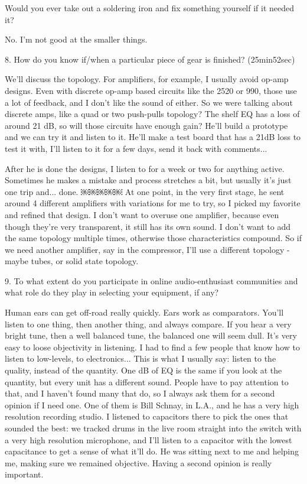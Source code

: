 Would you ever take out a soldering iron and fix something yourself if it needed it?

No. I'm not good at the smaller things.

8. How do you know if/when a particular piece of gear is finished? (25min52sec)

We'll discuss the topology. For amplifiers, for example, I usually avoid op-amp designs. Even with discrete op-amp based circuits like the 2520 or 990, those use a lot of feedback, and I don't like the sound of either. So we were talking about discrete amps, like a quad or two push-pulls topology? The shelf EQ has a loss of around 21 dB, so will those circuits have enough gain? He'll build a prototype and we can try it and listen to it. He'll make a test board that has a 21dB loss to test it with, I'll listen to it for a few days, send it back with comments...

After he is done the designs, I listen to for a week or two for anything active. Sometimes he makes a mistake and process stretches a bit, but usually it's just one trip and... done.
￼￼￼￼￼
At one point, in the very first stage, he sent around 4 different amplifiers with variations for me to try, so I picked my favorite and refined that design. I don't want to overuse one amplifier, because even though they're very transparent, it still has its own sound. I don't want to add the same topology multiple times, otherwise those characteristics compound. So if we need another amplifier, say in the compressor, I'll use a different topology - maybe tubes, or solid state topology.

9. To what extent do you participate in online audio-enthusiast communities and what role do they play in selecting your equipment, if any?

Human ears can get off-road really quickly. Ears work as comparators. You'll listen to one thing, then another thing, and always compare. If you hear a very bright tune, then a well balanced tune, the balanced one will seem dull. It's very easy to loose objectivity in listening. I had to find a few people that know how to listen to low-levels, to electronics... This is what I usually say: listen to the quality, instead of the quantity. One dB of EQ is the same if you look at the quantity, but every unit has a different sound. People have to pay attention to that, and I haven't found many that do, so I always ask them for a second opinion if I need one. One of them is Bill Schnay, in L.A., and he has a very high resolution recording studio. I listened to capacitors there to pick the ones that sounded the best: we tracked drums in the live room straight into the switch with a very high resolution microphone, and I'll listen to a capacitor with the lowest capacitance to get a sense of what it'll do. He was sitting next to me and helping me, making sure we remained objective. Having a second opinion is really important.

